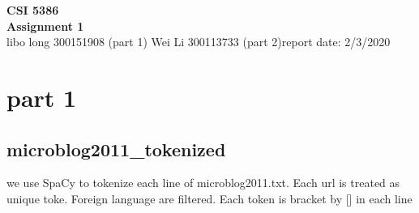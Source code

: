\documentclass[a4paper, 11pt]{article}
\begin{document}
\noindent
\newtheorem{thm}{Theorem}
\large\textbf{CSI 5386} \\
\textbf{Assignment 1} \\
\normalsize 
libo long 300151908 (part 1)
Wei Li 300113733 (part 2)\hfill report date: 2/3/2020 \\
\section{part 1}
\subsection{microblog2011\_tokenized}
we use SpaCy to tokenize each line of microblog2011.txt. Each url is treated as unique toke. Foreign language are filtered. Each token is bracket by [] in each line
\end{document}
